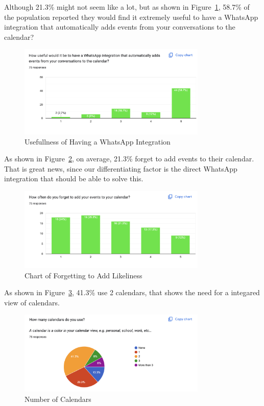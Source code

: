 \documentclass[12pt,a4paper]{report}
\begin{document}
Although 21.3\% might not seem like a lot, but as shown in Figure~\ref{fig:usefullness}, 58.7\% of the population reported they would find it extremely useful to have a WhatsApp integration that automatically adds events from your conversations to the calendar?

\begin{figure}[!h]
    \centering
    \includegraphics[width=0.8\textwidth]{images/survey/usefullness.png}
    \caption{Usefullness of Having a WhatsApp Integration}
    \label{fig:usefullness}
\end{figure}

As shown in Figure~\ref{fig:forget-to-add}, on average, 21.3\% forget to add events to their calendar. That is great news, since our differentiating factor is the direct WhatsApp integration that should be able to solve this.

\begin{figure}[!h]
    \centering
    \includegraphics[width=0.8\textwidth]{images/survey/forget-to-add.png}
    \caption{Chart of Forgetting to Add Likeliness}
    \label{fig:forget-to-add}
\end{figure}

As shown in Figure~\ref{fig:number-of-calendars}, 41.3\% use 2 calendars, that shows the need for a integared view of calendars.

\begin{figure}[!h]
    \centering
    \includegraphics[width=0.8\textwidth]{images/survey/number-of-calendars.png}
    \caption{Number of Calendars}
    \label{fig:number-of-calendars}
\end{figure}
\end{document}
